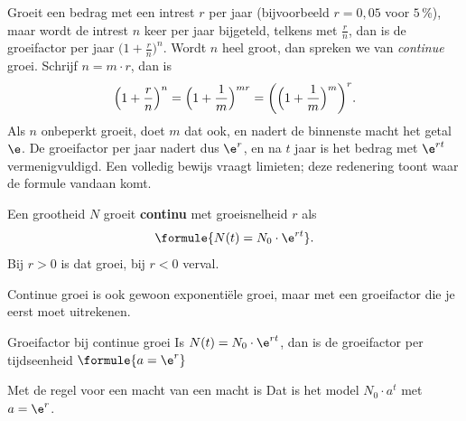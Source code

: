 Groeit een bedrag met een intrest $r$ per jaar (bijvoorbeeld $r = 0{,}05$ voor $5$\,\%), maar wordt de intrest $n$ keer per jaar bijgeteld, telkens met $\frac{r}{n}$, dan is de groeifactor per jaar $\bigl(1 + \frac{r}{n}\bigr)^n$. Wordt $n$ heel groot, dan spreken we van \textit{continue} groei. Schrijf $n = m \cdot r$, dan is
\[\Bigl(1 + \frac{r}{n}\Bigr)^n = \Bigl(1 + \frac{1}{m}\Bigr)^{m r} = \biggl(\Bigl(1 + \frac{1}{m}\Bigr)^{m}\biggr)^{r} .\]
Als $n$ onbeperkt groeit, doet $m$ dat ook, en nadert de binnenste macht het getal $\e$. De groeifactor per jaar nadert dus $\e^r$, en na $t$ jaar is het bedrag met $\e^{rt}$ vermenigvuldigd. Een volledig bewijs vraagt limieten; deze redenering toont waar de formule vandaan komt.

\begin{theorie}
Een grootheid $N$ groeit \textbf{\textcolor{accent}{continu}} met groeisnelheid $r$ als
\[\formule{N(t) = N_0 \cdot \e^{rt}}.\]
Bij $r > 0$ is dat groei, bij $r < 0$ verval.
\end{theorie}


\begin{oefeningen}
\end{oefeningen}

Continue groei is ook gewoon exponentiële groei, maar met een groeifactor die je eerst moet uitrekenen.

\begin{theorie}
\begin{stelling}{Groeifactor bij continue groei}
Is $N(t) = N_0 \cdot \e^{rt}$, dan is de groeifactor per tijdseenheid \qquad $\formule{a = \e^r}$
\end{stelling}
\begin{bewijs}
Met de regel voor een macht van een macht is
Dat is het model $N_0 \cdot a^t$ met $a = \e^r$.
\end{bewijs}
\end{theorie}

